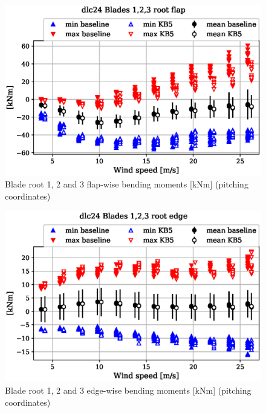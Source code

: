 \begin{figure}[!ht]
\begin{center}
	\includegraphics[width=.85\linewidth]{figures/baseline-vs-KB6/dlc24/blade1-blade1-node-001-momentvec-x_AA0008_AA0008.eps}
\end{center}
\caption{Blade root 1, 2 and 3 flap-wise bending moments [kNm] (pitching coordinates)}
\label{fig:baseline-vs-KB6:dlc24:blade-root-flap}
\end{figure}

\begin{figure}[!ht]
\begin{center}
	\includegraphics[width=.85\linewidth]{figures/baseline-vs-KB6/dlc24/blade1-blade1-node-001-momentvec-y_AA0008_AA0008.eps}
\end{center}
\caption{Blade root 1, 2 and 3 edge-wise bending moments [kNm] (pitching coordinates)}
\label{fig:baseline-vs-KB6:dlc24:blade-root-edge}
\end{figure}

